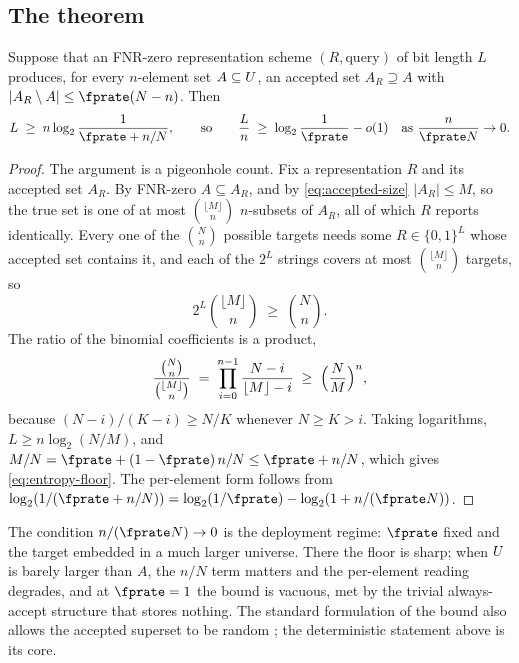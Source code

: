\subsection*{The theorem}

\begin{theorem}
\label{thm:entropy-floor}
Suppose that an FNR-zero representation scheme $(R, \mathrm{query})$ of bit
length $L$ produces, for every $n$-element set $A \subseteq U$, an
accepted set $A_R \supseteq A$ with $|A_R \setminus A| \le \fprate(N - n)$.
Then
\begin{equation}
\label{eq:entropy-floor}
  L \;\ge\; n \log_2 \frac{1}{\fprate + n/N},
  \qquad\text{so}\qquad
  \frac{L}{n} \;\ge\; \log_2 \frac{1}{\fprate} - o(1)
  \quad\text{as } \frac{n}{\fprate N} \to 0.
\end{equation}
\end{theorem}

\begin{proof}
The argument is a pigeonhole count. Fix a representation $R$ and its accepted
set $A_R$. By FNR-zero $A \subseteq A_R$, and by \eqref{eq:accepted-size}
$|A_R| \le M$, so the true set is one of at most $\binom{\lfloor M \rfloor}{n}$
$n$-subsets of $A_R$, all of which $R$ reports identically. Every one of the
$\binom{N}{n}$ possible targets needs some $R \in \{0,1\}^L$ whose accepted
set contains it, and each of the $2^L$ strings covers at most
$\binom{\lfloor M \rfloor}{n}$ targets, so
\begin{equation}
\label{eq:pigeonhole}
  2^L \binom{\lfloor M \rfloor}{n} \;\ge\; \binom{N}{n}.
\end{equation}
The ratio of the binomial coefficients is a product,
\[
  \frac{\binom{N}{n}}{\binom{\lfloor M \rfloor}{n}}
  \;=\; \prod_{i=0}^{n-1} \frac{N - i}{\lfloor M \rfloor - i}
  \;\ge\; \Bigl(\frac{N}{M}\Bigr)^{n},
\]
because $(N - i)/(K - i) \ge N/K$ whenever $N \ge K > i$. Taking logarithms,
$L \ge n \log_2(N/M)$, and $M/N = \fprate + (1 - \fprate)\,n/N \le \fprate +
n/N$, which gives \eqref{eq:entropy-floor}. The per-element form follows from
$\log_2(1/(\fprate + n/N)) = \log_2(1/\fprate) - \log_2(1 + n/(\fprate N))$.
\end{proof}

The condition $n/(\fprate N) \to 0$ is the deployment regime: $\fprate$ fixed
and the target embedded in a much larger universe. There the floor is sharp;
when $U$ is barely larger than $A$, the $n/N$ term matters and the
per-element reading degrades, and at $\fprate = 1$ the bound is vacuous, met by
the trivial always-accept structure that stores nothing. The standard
formulation of the bound also allows the accepted superset to be random
\parencite{pagh-pagh-rao-2005}; the deterministic statement above is its core.

